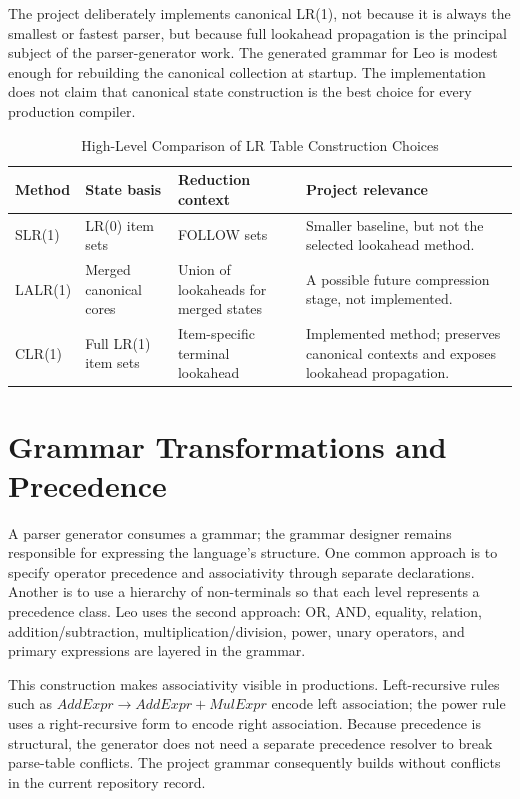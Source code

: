 \documentclass[12pt,a4paper,oneside]{report}
\begin{document}
The project deliberately implements canonical LR(1), not because it is always the smallest or fastest parser, but because full lookahead propagation is the principal subject of the parser-generator work. The generated grammar for Leo is modest enough for rebuilding the canonical collection at startup. The implementation does not claim that canonical state construction is the best choice for every production compiler.

\begin{table}[H]
\centering
\caption{High-Level Comparison of LR Table Construction Choices}
\begin{tabularx}{\textwidth}{p{2.0cm}YYY}
\toprule
\textbf{Method} & \textbf{State basis} & \textbf{Reduction context} & \textbf{Project relevance}\\
\midrule
SLR(1) & LR(0) item sets & FOLLOW sets & Smaller baseline, but not the selected lookahead method.\\
LALR(1) & Merged canonical cores & Union of lookaheads for merged states & A possible future compression stage, not implemented.\\
CLR(1) & Full LR(1) item sets & Item-specific terminal lookahead & Implemented method; preserves canonical contexts and exposes lookahead propagation.\\
\bottomrule
\end{tabularx}
\end{table}

\section{Grammar Transformations and Precedence}
A parser generator consumes a grammar; the grammar designer remains responsible for expressing the language's structure. One common approach is to specify operator precedence and associativity through separate declarations. Another is to use a hierarchy of non-terminals so that each level represents a precedence class. Leo uses the second approach: OR, AND, equality, relation, addition/subtraction, multiplication/division, power, unary operators, and primary expressions are layered in the grammar.

This construction makes associativity visible in productions. Left-recursive rules such as $AddExpr\to AddExpr + MulExpr$ encode left association; the power rule uses a right-recursive form to encode right association. Because precedence is structural, the generator does not need a separate precedence resolver to break parse-table conflicts. The project grammar consequently builds without conflicts in the current repository record.
\end{document}
